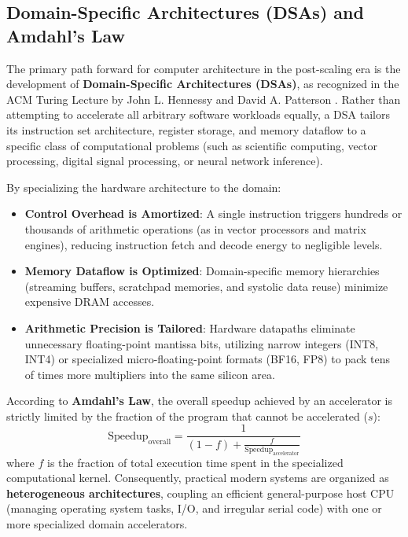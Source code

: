 \subsection{Domain-Specific Architectures (DSAs) and Amdahl's Law}
The primary path forward for computer architecture in the post-scaling era is the development of \textbf{Domain-Specific Architectures (DSAs)}, as recognized in the ACM Turing Lecture by John L. Hennessy and David A. Patterson \cite{hennessy2019new}. Rather than attempting to accelerate all arbitrary software workloads equally, a DSA tailors its instruction set architecture, register storage, and memory dataflow to a specific class of computational problems (such as scientific computing, vector processing, digital signal processing, or neural network inference).

By specializing the hardware architecture to the domain:
\begin{itemize}
    \item \textbf{Control Overhead is Amortized}: A single instruction triggers hundreds or thousands of arithmetic operations (as in vector processors and matrix engines), reducing instruction fetch and decode energy to negligible levels.
    \item \textbf{Memory Dataflow is Optimized}: Domain-specific memory hierarchies (streaming buffers, scratchpad memories, and systolic data reuse) minimize expensive DRAM accesses.
    \item \textbf{Arithmetic Precision is Tailored}: Hardware datapaths eliminate unnecessary floating-point mantissa bits, utilizing narrow integers (INT8, INT4) or specialized micro-floating-point formats (BF16, FP8) to pack tens of times more multipliers into the same silicon area.
\end{itemize}

According to \textbf{Amdahl's Law}, the overall speedup achieved by an accelerator is strictly limited by the fraction of the program that cannot be accelerated ($s$):
\begin{equation}
\text{Speedup}_{\text{overall}} = \frac{1}{(1 - f) + \frac{f}{\text{Speedup}_{\text{accelerator}}}}
\end{equation}
where $f$ is the fraction of total execution time spent in the specialized computational kernel. Consequently, practical modern systems are organized as \textbf{heterogeneous architectures}, coupling an efficient general-purpose host CPU (managing operating system tasks, I/O, and irregular serial code) with one or more specialized domain accelerators.

